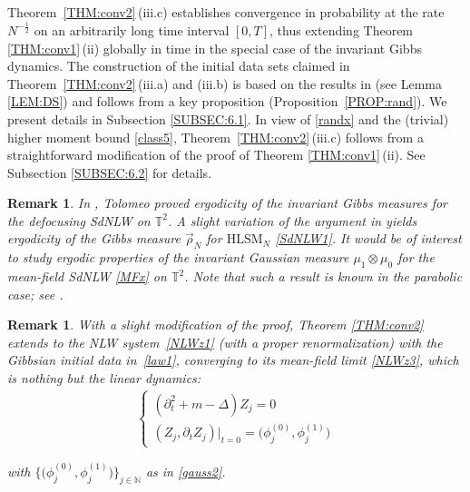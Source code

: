 \documentclass[letterpaper, 11pt,  reqno]{amsart}
\newtheorem{remark}[theorem]{Remark}
\newcommand{\1}{\hspace{0.5mm}\text{I}\hspace{0.2mm}}
\newcommand{\noi}{\noindent}
\newcommand{\T}{\mathbb{T}}
\newcommand{\N}{\mathbb{N}}
\newcommand{\Dl}{\Delta}
\newcommand{\dt}{\partial_t}
\newcommand{\rhoo}{\vec \rho_N}
\newcommand{\HLS}{$\text{HLSM}_N$ }
\numberwithin{equation}{section}
\numberwithin{theorem}{section}
\begin{document}
Theorem~\ref{THM:conv2}\,(iii.c)
establishes convergence in probability 
at the rate $N^{-\frac 12}$
on an arbitrarily long time interval $[0, T]$, 
thus extending Theorem \ref{THM:conv1}\,(ii)
globally in time in the special case
of the invariant Gibbs dynamics.
The construction of the initial data sets claimed in 
Theorem~\ref{THM:conv2}\,(iii.a) and (iii.b)
is based on the results in  
\cite{SSZZ, DS} (see Lemma \ref{LEM:DS})
and follows from a key proposition (Proposition~\ref{PROP:rand}).
We present details in Subsection \ref{SUBSEC:6.1}.
In view of \eqref{randx}
and the (trivial) higher moment bound
\eqref{class5}, 
Theorem~\ref{THM:conv2}\,(iii.c)
 follows from a
 straightforward modification
 of the proof of Theorem \ref{THM:conv1}\,(ii).
See  Subsection \ref{SUBSEC:6.2} for details.






\begin{remark} \rm
In \cite{Tolo2}, 
Tolomeo  proved ergodicity of the invariant Gibbs measures 
for the defocusing SdNLW on $\T^2$.
A slight variation of the argument  in \cite{Tolo2} 
yields ergodicity of the Gibbs measure $\rhoo$
for \HLS \eqref{SdNLW1}.
 It would be of interest to study ergodic properties of the invariant Gaussian measure 
 $\mu_1 \otimes \mu_0$ for the mean-field SdNLW \eqref{MFx}
 on $\T^2$.
 Note that such a result is known in the parabolic case;
 see \cite{SSZZ}.
\end{remark}


\begin{remark}\rm
With a slight modification of the proof, Theorem \ref{THM:conv2} 
extends to 
the NLW system~\eqref{NLWz1} (with a proper renormalization)
with the Gibbsian initial data in~\eqref{law1}, 
converging
to its mean-field limit \eqref{NLWz3}, 
which is nothing but the linear dynamics:
\begin{align*}
\begin{cases}
    (\dt^2 +  m - \Dl) Z_j = 0\\
    (Z_j, \dt Z_j) |_{t = 0} = \big(\phi^{(0)}_j, \phi^{(1)}_j\big)
\end{cases}
\end{align*}

\noi
with
$\big\{ \big(\phi^{(0)}_j, \phi^{(1)}_j\big)\big\}_{j \in \N}$
 as in \eqref{gauss2}.

\end{remark}
\end{document}
